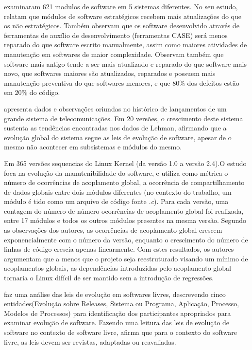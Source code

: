 \cite{kemerer1997determinants} examinaram 621 modulos de software em 5 sistemas diferentes. No seu estudo, relatam que módulos de software estratégicos recebem mais atualizações do que os não estratégicos. Também observam que os software desenvolvido através de ferramentas de auxílio de desenvolvimento (ferramentas CASE) será menos reparado do que software escrito manualmente, assim como maiores atividades de manutenção em softwares de maior complexidade. Observam também que software mais antigo tende a ser mais atualizado e reparado do que software mais novo, que softwares maiores são atualizados, reparados e possuem mais manutenção preventiva do que softwares menores, e que 80\% dos defeitos estão em 20\% do código.

\cite{gall1997software} apresenta dados e observações oriundas no histórico de lançamentos de um grande sistema de telecomunicações. Em 20 versões, o crescimento deste sistema sustenta as tendências encontradas nos dados de Lehman, afirmando que a evolução global do sistema segue as leis de evolução de software, apesar de o mesmo não acontecer em subsistemas e módulos do mesmo.

Em \cite{schach2002maintainability} 365 versões sequencias do Linux Kernel (da versão 1.0 a versão
2.4).O estudo foca na evolução da manutenibilidade do software, e utiliza como métrica o número de ocorrências de acoplamento global, a ocorrência de compartilhamento de dados globais entre dois módulos diferentes (no contexto do trabalho, um módulo é tido como um arquivo de código fonte \textit{.c}).  Para cada versão, uma contagem do número de número ocorrências de acoplamento global foi realizada, entre 17 módulos e todos os outros módulos presentes na mesma versão. Segundo as observações dos autores, as ocorrências de acoplamento global crescem exponencialmente com o número da
versão, enquanto o crescimento do número de linhas de código
crescia apenas linearmente. Com estes resultados, os autores argumentam que
a menos que o projeto seja reestruturado visando um mínimo de acoplamentos globais, as
dependências introduzidas pelo acoplamento global tornaria o Linux difícil de ser mantido
sem a introdução de regressões.

\cite{scacchi2003understanding} faz uma análise das leis de evolução em softwares livres, descrevendo cinco entidades(Evolução sobre Releases, Sistema ou Programa, Aplicação, Processo, Modelos de Processos) para identificação dos participantes apropriados para examinar evolução de software. Fazendo uma leitura das leis de evolução de software no contexto de software livre, afirma que para o contexto do software livre, as leis devem ser revistas, adaptadas ou reavaliadas.

